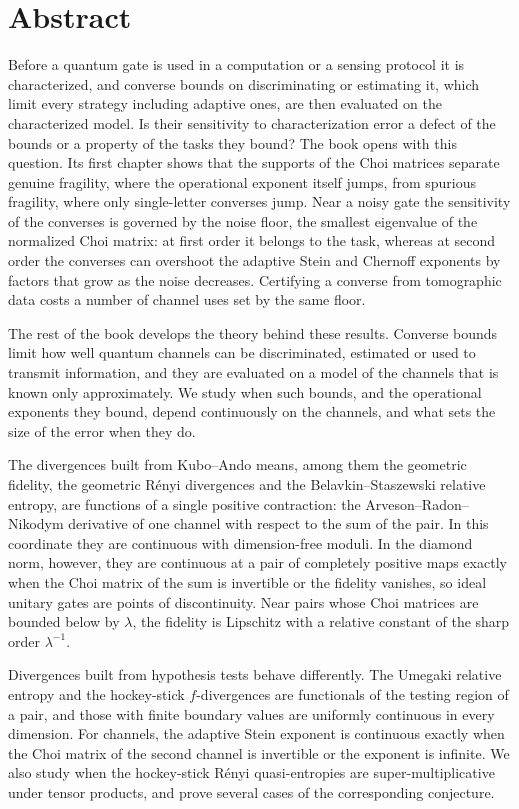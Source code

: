 \chapter*{Abstract}

Before a quantum gate is used in a computation or a sensing protocol it is characterized, and converse bounds on discriminating or estimating it, which limit every strategy including adaptive ones, are then evaluated on the characterized model. Is their sensitivity to characterization error a defect of the bounds or a property of the tasks they bound? The book opens with this question. Its first chapter shows that the supports of the Choi matrices separate genuine fragility, where the operational exponent itself jumps, from spurious fragility, where only single-letter converses jump. Near a noisy gate the sensitivity of the converses is governed by the noise floor, the smallest eigenvalue of the normalized Choi matrix: at first order it belongs to the task, whereas at second order the converses can overshoot the adaptive Stein and Chernoff exponents by factors that grow as the noise decreases. Certifying a converse from tomographic data costs a number of channel uses set by the same floor.

The rest of the book develops the theory behind these results. Converse bounds limit how well quantum channels can be discriminated, estimated or used to transmit information, and they are evaluated on a model of the channels that is known only approximately. We study when such bounds, and the operational exponents they bound, depend continuously on the channels, and what sets the size of the error when they do.

The divergences built from Kubo--Ando means, among them the geometric fidelity, the geometric R\'enyi divergences and the Belavkin--Staszewski relative entropy, are functions of a single positive contraction: the Arveson--Radon--Nikodym derivative of one channel with respect to the sum of the pair. In this coordinate they are continuous with dimension-free moduli. In the diamond norm, however, they are continuous at a pair of completely positive maps exactly when the Choi matrix of the sum is invertible or the fidelity vanishes, so ideal unitary gates are points of discontinuity. Near pairs whose Choi matrices are bounded below by $\lambda$, the fidelity is Lipschitz with a relative constant of the sharp order $\lambda^{-1}$.

Divergences built from hypothesis tests behave differently. The Umegaki relative entropy and the hockey-stick $f$-divergences are functionals of the testing region of a pair, and those with finite boundary values are uniformly continuous in every dimension. For channels, the adaptive Stein exponent is continuous exactly when the Choi matrix of the second channel is invertible or the exponent is infinite. We also study when the hockey-stick R\'enyi quasi-entropies are super-multiplicative under tensor products, and prove several cases of the corresponding conjecture.

